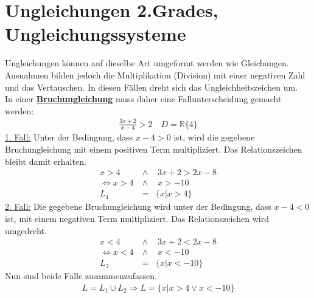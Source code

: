 \documentclass[a4paper, twoside, parskip, 10pt, smallheadings]{scrbook}
\theoremstyle{plain}
\theoremstyle{definition}
\begin{document}
\section{Ungleichungen 2.Grades, Ungleichungssysteme}
Ungleichungen k\"{o}nnen auf dieselbe Art umgeformt werden wie Gleichungen. Ausnahmen
bilden jedoch die Multiplikation (Division) mit einer negativen Zahl und das
Vertauschen. In diesen F\"{a}llen dreht sich das
Ungleichheitszeichen um.\\
In einer \underline{\bf Bruchungleichung} muss daher eine Fallunterscheidung gemacht
werden:\begin{eqnarray}
  \frac{3x+2}{x-4}>2 \quad D=\mathbb{R}\{4\}
\end{eqnarray} \underline{1. Fall:} Unter der Bedingung, dass $x-4>0$ ist, wird die gegebene
Bruchungleichung mit einem positiven Term multipliziert. Das Relationszeichen bleibt
damit erhalten. \begin{eqnarray}
  x>4 \:&\wedge& \: 3x+2>2x-8\\[0.4cm]
  \Leftrightarrow x>4 \:&\wedge& \: x>-10\\[0.4cm]
  L_1&=&\{x|x>4\}
\end{eqnarray} \underline{2. Fall:} Die gegebene Bruchungleichung wird unter der Bedingung, dass
$x-4<0$ ist, mit einem negativen Term multipliziert. Das Relationszeichen wird
umgedreht. \begin{eqnarray}
  x<4 \:&\wedge& \: 3x+2<2x-8\\
  \Leftrightarrow x<4 \:&\wedge& \: x<-10\\
  L_2&=&\{x|x<-10\}
\end{eqnarray} Nun sind beide F\"{a}lle zusammenzufassen. \begin{eqnarray} L=L_1\cup L_2 \Rightarrow L=\{x|x>4  \vee x<-10\}
\end{eqnarray}
\end{document}
